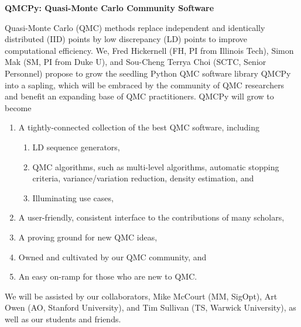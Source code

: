 \documentclass[11pt]{NSFamsart}
\begin{document}

\begin{center}
\Large \textbf{
QMCPy: Quasi-Monte Carlo Community Software\\ 
}
\end{center}
\vspace{-2ex}

\setcounter{tocdepth}{1}
\tableofcontents

\vspace{-6ex}


Quasi-Monte Carlo (QMC) methods replace independent and identically distributed (IID) points by low discrepancy (LD) points to improve computational efficiency.  We, \hypertarget{FHlink}{Fred Hickernell} (FH, PI from Illinois Tech), \hypertarget{SMlink}{Simon Mak} (SM, PI from Duke U), and \hypertarget{SCTClink}{Sou-Cheng Terrya Choi} (SCTC, Senior Personnel) propose to grow the seedling Python QMC software library QMCPy \cite{QMCPy2020a} into a sapling, which will be embraced by the community of QMC researchers and benefit an expanding base of QMC practitioners.  QMCPy will grow to become
\begin{enumerate}
\renewcommand{\labelenumi}{\arabic{enumi}.}
    \item A tightly-connected collection of the best QMC software, including
    \begin{enumerate}
    \renewcommand{\labelenumii}{\alph{enumii}.}
        \item LD sequence generators,
        \item QMC algorithms, such as multi-level algorithms, automatic stopping criteria, variance/variation reduction, density estimation, and
        \item Illuminating use cases,
    \end{enumerate}
    \item A user-friendly, consistent interface to the contributions of many scholars,
    \item A proving ground for new QMC ideas,
    \item Owned and cultivated by our QMC community, and
    \item An easy on-ramp for those who are new to QMC.
\end{enumerate}
We will be assisted by our collaborators, \hypertarget{MMllink}{Mike McCourt} (MM, SigOpt), \hypertarget{AOlink}{Art Owen} (AO, Stanford University), and \hypertarget{TSlink}{Tim Sullivan} (TS, Warwick University), as well as our students and friends.
\end{document}
